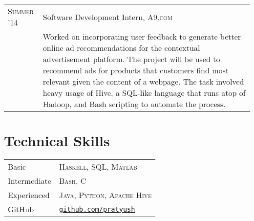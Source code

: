 \documentclass[10pt]{article}
\begin{document}
\begin{tabular}{R{2.5cm}p{13cm}}
  \textsc{Summer '14}     & Software Development Intern, \textsc{A9.com}\\

                          &\footnotesize{%
                             Worked on incorporating user feedback to generate
                             better online ad recommendations for the
                             contextual advertisement platform. The project
                             will be used to recommend ads for products that
                             customers find most relevant given the content of
                             a webpage. The task involved heavy usage of Hive,
                             a SQL-like language that runs atop of Hadoop, and
                             Bash scripting to automate the process.
                            }
\end{tabular}

\section{Technical Skills}
\begin{tabular}{R{2.5cm}l}
  Basic         & \textsc{Haskell}, \textsc{SQL}, \textsc{Matlab}\\
  Intermediate  & \textsc{Bash, C}\\
  Experienced   & \textsc{Java, Python, Apache Hive}\\
  GitHub        & \href{https://www.github.com/pratyush}{\texttt{github.com/pratyush}}
\end{tabular}
\nocite{*}
\printbibliography{}
\end{document}
